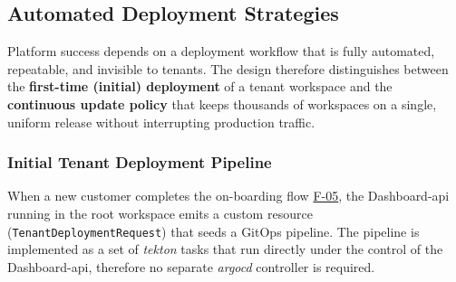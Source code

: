 \documentclass[11pt, a4paper, oneside, listof=totoc]{scrartcl}
\begin{document}
        \clearpage

        \subsection{Automated Deployment Strategies}\label{subsec:deploymentStrategies}
            Platform success depends on a deployment workflow that is fully automated, repeatable,
            and invisible to tenants.
            The design therefore distinguishes between the \textbf{first-time (initial) deployment}
            of a tenant workspace and the \textbf{continuous update policy} that keeps thousands of
            workspaces on a single, uniform release without interrupting production traffic.

            \subsubsection{Initial Tenant Deployment Pipeline}\label{subsubsec:initialDeeployment}
                When a new customer completes the on-boarding flow \hyperlink{f5}{F-05}, the
                Dashboard-\gls{api} running in the root workspace emits a custom resource
                (\texttt{TenantDeploymentRequest}) that seeds a GitOps pipeline.
                The pipeline is implemented as a set of \textit{\gls{tekton}} tasks that run
                directly under the control of the Dashboard-\gls{api}, therefore no separate
                \textit{\gls{argocd}} controller is required.
\end{document}
